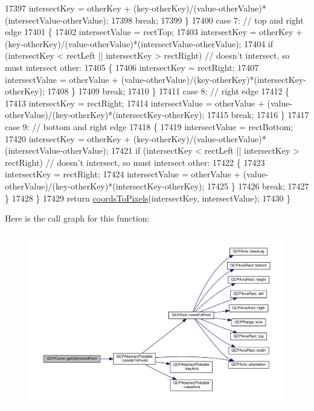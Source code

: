 \begin{DoxyCode}
17397       intersectKey = otherKey + (key-otherKey)/(value-otherValue)*(intersectValue-otherValue);
17398       \textcolor{keywordflow}{break};
17399     \}
17400     \textcolor{keywordflow}{case} 7: \textcolor{comment}{// top and right edge}
17401     \{
17402       intersectValue = rectTop;
17403       intersectKey = otherKey + (key-otherKey)/(value-otherValue)*(intersectValue-otherValue);
17404       \textcolor{keywordflow}{if} (intersectKey < rectLeft || intersectKey > rectRight) \textcolor{comment}{// doesn't intersect, so must intersect
       other:}
17405       \{
17406         intersectKey = rectRight;
17407         intersectValue = otherValue + (value-otherValue)/(key-otherKey)*(intersectKey-otherKey);
17408       \}
17409       \textcolor{keywordflow}{break};
17410     \}
17411     \textcolor{keywordflow}{case} 8: \textcolor{comment}{// right edge}
17412     \{
17413       intersectKey = rectRight;
17414       intersectValue = otherValue + (value-otherValue)/(key-otherKey)*(intersectKey-otherKey);
17415       \textcolor{keywordflow}{break};
17416     \}
17417     \textcolor{keywordflow}{case} 9: \textcolor{comment}{// bottom and right edge}
17418     \{
17419       intersectValue = rectBottom;
17420       intersectKey = otherKey + (key-otherKey)/(value-otherValue)*(intersectValue-otherValue);
17421       \textcolor{keywordflow}{if} (intersectKey < rectLeft || intersectKey > rectRight) \textcolor{comment}{// doesn't intersect, so must intersect
       other:}
17422       \{
17423         intersectKey = rectRight;
17424         intersectValue = otherValue + (value-otherValue)/(key-otherKey)*(intersectKey-otherKey);
17425       \}
17426       \textcolor{keywordflow}{break};
17427     \}
17428   \}
17429   \textcolor{keywordflow}{return} \hyperlink{class_q_c_p_abstract_plottable_ade710a776104b14c1c835168ce1bfc5c}{coordsToPixels}(intersectKey, intersectValue);
17430 \}
\end{DoxyCode}


Here is the call graph for this function\+:\nopagebreak
\begin{figure}[H]
\begin{center}
\leavevmode
\includegraphics[width=350pt]{class_q_c_p_curve_acbcfea8986dde6c0143e3f7e8e76041d_cgraph}
\end{center}
\end{figure}




